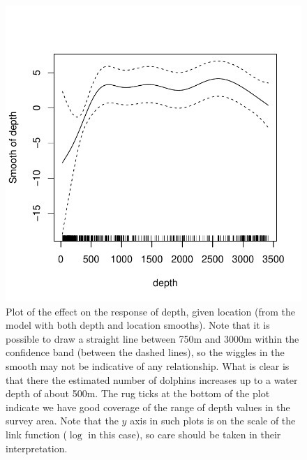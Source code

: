 \documentclass[a4paper,12pt]{article}
\begin{document}
\newpage

\begin{figure}[h!]
  \caption{Plot of the effect on the response of depth, given location (from the model with both depth and location smooths). Note that it is possible to draw a straight line between 750m and 3000m within the confidence band (between the dashed lines), so the wiggles in the smooth may not be indicative of any relationship. What is clear is that there the estimated number of dolphins increases up to a water depth of about 500m. The rug ticks at the bottom of the plot indicate we have good coverage of the range of depth values in the survey area. Note that the $y$ axis in such plots is on the scale of the link function ($\log$ in this case), so care should be taken in their interpretation.}
  \label{depth-gamplot}
  \begin{center}
    \includegraphics[width=\textwidth]{fit-depth-gam}
  \end{center}
\end{figure}

\newpage
\end{document}
